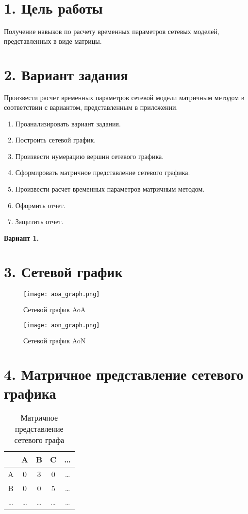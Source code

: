 \documentclass[a4paper,12pt]{article}
\begin{document}
\section*{1. Цель работы}
Получение навыков по расчету временных параметров сетевых моделей, представленных в виде матрицы.

\section*{2. Вариант задания}
Произвести расчет временных параметров сетевой модели матричным методом в соответствии с вариантом, представленным в приложении.

\begin{enumerate}
    \item Проанализировать вариант задания.
    \item Построить сетевой график.
    \item Произвести нумерацию вершин сетевого графика.
    \item Сформировать матричное представление сетевого графика.
    \item Произвести расчет временных параметров матричным методом.
    \item Оформить отчет.
    \item Защитить отчет.
\end{enumerate}

\textbf{Вариант 1.}

\section*{3. Сетевой график}
\begin{figure}[H]
    \centering
    \texttt{[image: aoa\_graph.png]}
    \caption{Сетевой график AoA}
\end{figure}

\begin{figure}[H]
    \centering
    \texttt{[image: aon\_graph.png]}
    \caption{Сетевой график AoN}
\end{figure}

\section*{4. Матричное представление сетевого графика}
\begin{table}[H]
    \centering
    \begin{tabular}{|c|c|c|c|c|}
        \hline
        & A & B & C & \ldots \\
        \hline
        A & 0 & 3 & 0 & \ldots \\
        \hline
        B & 0 & 0 & 5 & \ldots \\
        \hline
        \ldots & \ldots & \ldots & \ldots & \ldots \\
        \hline
    \end{tabular}
    \caption{Матричное представление сетевого графа}
\end{table}
\end{document}

